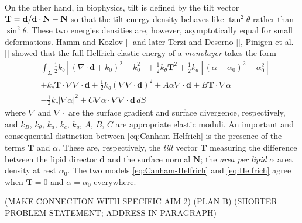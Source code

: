 On the other hand, in biophysics, tilt is defined by the tilt vector
  $\mathbf{T} = \mathbf{d}/\mathbf{d}\cdot \mathbf{N} - \mathbf{N}$ so that the tilt energy density
  behaves like $\tan^2 \theta$ rather than $\sin^2 \theta$.
  These two energies densities are, however, asymptotically equal
  for small deformations.
Hamm and Kozlov [] and later Terzi and Deserno [], Pinigen et al. []
showed that the full Helfrich elastic energy of a \emph{monolayer} takes the form
\begin{equation}
\label{eq:Helfrich}
  \begin{aligned}
 &\int_{\Sigma}
\tfrac{1}{2}k_{b}[(\nabla \cdot \mathbf{d} + k_{0})^{2} -  k^{2}_{0}]  
+ \tfrac{1}{2}k_{\theta}\mathbf{T}^{2} + \tfrac{1}{2}k_a[(\alpha - \alpha_0)^2 - \alpha_0^2] \\
&+ k_{c}\textbf{T} \cdot \nabla \nabla \cdot \mathbf{d}  + \tfrac{1}{2}k_{g}(\nabla \nabla \cdot \mathbf{d})^{2}
 + A\alpha \nabla \cdot \mathbf{d}
+ B \mathbf{T} \cdot \nabla \alpha \\
&- \tfrac{1}{2}k_c |\nabla \alpha|^2 + C \nabla \alpha \cdot \nabla \nabla \cdot \mathbf{d}\,dS
\end{aligned}
\end{equation}
where $\nabla$ and $\nabla \cdot$ are the surface gradient and surface divergence,
respectively, and $k_B$, $k_{\theta}$, $k_a$, $k_c$, $k_g$, $A$, $B$, $C$ are
appropriate elastic moduli.  An important and consequential distinction between
\eqref{eq:Canham-Helfrich} is the presence of the terms $\mathbf{T}$ and $\alpha$.
These are, respectively, the \emph{tilt} vector $\mathbf{T}$ measuring
the difference between the lipid director $\mathbf{d}$ and the surface normal
$\mathbf{N}$; the \emph{area per lipid} $\alpha$ area density at rest $\alpha_0$.
The two models \eqref{eq:Canham-Helfrich} and \eqref{eq:Helfrich} agree
when $\mathbf{T} = 0$ and $\alpha = \alpha_0$ everywhere.

(MAKE CONNECTION WITH SPECIFIC AIM 2)
(PLAN B)
(SHORTER PROBLEM STATEMENT; ADDRESS IN PARAGRAPH)



%
%
%
%
%
%
